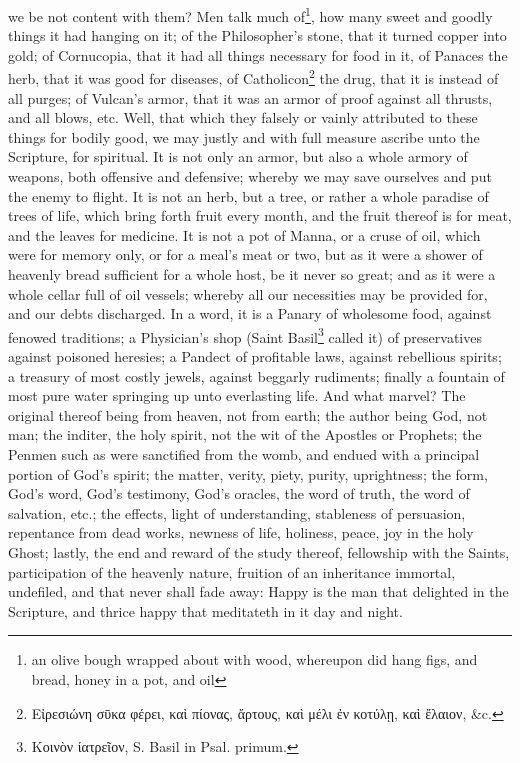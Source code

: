 we be not content with them? Men talk much of\footnote{an olive bough wrapped about with wood, whereupon did hang figs, and bread, honey in a pot, and oil}, how many sweet and goodly things it had hanging on it; of the Philosopher's stone, that it turned copper into gold; of Cornucopia, that it had all things necessary for food in it, of Panaces the herb, that it was good for diseases, of Catholicon\footnote{\foreignlanguage{greek}{Εἰρεσιώνη σῡκα φέρει, καὶ πίονας, ἄρτους, καὶ μέλι ἐν κοτύλῃ, καὶ ἔλαιον, \&c.}} the drug, that it is instead of all purges; of Vulcan's armor, that it was an armor of proof against all thrusts, and all blows, etc. Well, that which they falsely or vainly attributed to these things for bodily good, we may justly and with full measure ascribe unto the Scripture, for spiritual. It is not only an armor, but also a whole armory of weapons, both offensive and defensive; whereby we may save ourselves and put the enemy to flight. It is not an herb, but a tree, or rather a whole paradise of trees of life, which bring forth fruit every month, and the fruit thereof is for meat, and the leaves for medicine. It is not a pot of Manna, or a cruse of oil, which were for memory only, or for a meal's meat or two, but as it were a shower of heavenly bread sufficient for a whole host, be it never so great; and as it were a whole cellar full of oil vessels; whereby all our necessities may be provided for, and our debts discharged. In a word, it is a Panary of wholesome food, against fenowed traditions; a Physician's shop (Saint Basil\footnote{\foreignlanguage{greek}{Κοινὸν ίατρεῖον}, S. Basil in Psal. primum.} called it) of preservatives against poisoned heresies; a Pandect of profitable laws, against rebellious spirits; a treasury of most costly jewels, against beggarly rudiments; finally a fountain of most pure water springing up unto everlasting life. And what marvel? The original thereof being from heaven, not from earth; the author being God, not man; the inditer, the holy spirit, not the wit of the Apostles or Prophets; the Penmen such as were sanctified from the womb, and endued with a principal portion of God's spirit; the matter, verity, piety, purity, uprightness; the form, God's word, God's testimony, God's oracles, the word of truth, the word of salvation, etc.; the effects, light of understanding, stableness of persuasion, repentance from dead works, newness of life, holiness, peace, joy in the holy Ghost; lastly, the end and reward of the study thereof, fellowship with the Saints, participation of the heavenly nature, fruition of an inheritance immortal, undefiled, and that never shall fade away: Happy is the man that delighted in the Scripture, and thrice happy that meditateth in it day and night.

